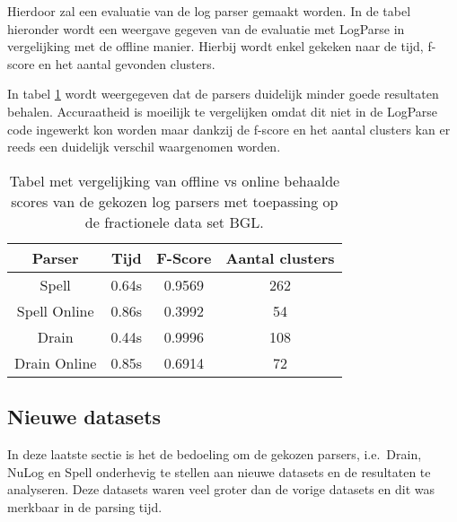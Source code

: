 Hierdoor zal een evaluatie van de log parser gemaakt worden. In de tabel hieronder wordt een weergave gegeven van de evaluatie met LogParse in vergelijking met de offline manier. Hierbij wordt enkel gekeken naar de tijd, f-score en het aantal gevonden clusters.

In tabel \ref{table:onlinetabel} wordt weergegeven dat de parsers duidelijk minder goede resultaten behalen. Accuraatheid is moeilijk te vergelijken omdat dit niet in de LogParse code ingewerkt kon worden maar dankzij de f-score en het aantal clusters kan er reeds een duidelijk verschil waargenomen worden.

\begin{table}[!htp]
    \caption{Tabel met vergelijking van offline vs online behaalde scores van de gekozen log parsers met toepassing op de fractionele data set BGL.}
    \label{table:onlinetabel}
    \begin{center}
        \begin{tabular}{||c | c | c | c||} 
            \hline
            Parser & Tijd & F-Score & Aantal clusters \\ [0.5ex] 
            \hline\hline
            
            Spell & 0.64s & 0.9569 & 262 \\
            
            Spell Online & 0.86s & 0.3992 & 54 \\
            
            Drain & 0.44s & 0.9996 & 108 \\
            
            Drain Online & 0.85s & 0.6914 & 72 \\

            \hline
        \end{tabular}
    \end{center}
\end{table}

\subsection{Nieuwe datasets}
In deze laatste sectie is het de bedoeling om de gekozen parsers, i.e.\ Drain, NuLog en Spell onderhevig te stellen aan nieuwe datasets en de resultaten te analyseren. Deze datasets waren veel groter dan de vorige datasets en dit was merkbaar in de parsing tijd.\\

